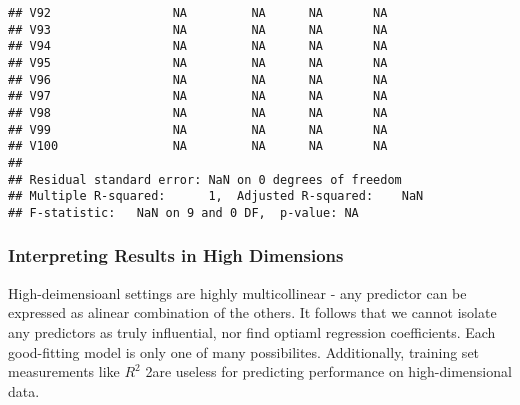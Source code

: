 \documentclass[
]{article}
\begin{document}
\begin{verbatim}
## V92                 NA         NA      NA       NA
## V93                 NA         NA      NA       NA
## V94                 NA         NA      NA       NA
## V95                 NA         NA      NA       NA
## V96                 NA         NA      NA       NA
## V97                 NA         NA      NA       NA
## V98                 NA         NA      NA       NA
## V99                 NA         NA      NA       NA
## V100                NA         NA      NA       NA
## 
## Residual standard error: NaN on 0 degrees of freedom
## Multiple R-squared:      1,  Adjusted R-squared:    NaN 
## F-statistic:   NaN on 9 and 0 DF,  p-value: NA
\end{verbatim}

\hypertarget{interpreting-results-in-high-dimensions}{%
\subsubsection{Interpreting Results in High
Dimensions}\label{interpreting-results-in-high-dimensions}}

High-deimensioanl settings are highly multicollinear - any predictor can
be expressed as alinear combination of the others. It follows that we
cannot isolate any predictors as truly influential, nor find optiaml
regression coefficients. Each good-fitting model is only one of many
possibilites. Additionally, training set measurements like \(R^2\) 2are
useless for predicting performance on high-dimensional data.
\end{document}
